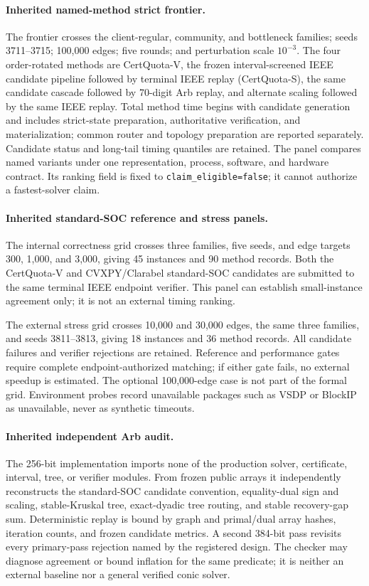 \paragraph{Inherited named-method strict frontier.}
The frontier crosses the client-regular, community, and bottleneck families;
seeds 3711--3715; 100,000 edges; five rounds; and perturbation scale $10^{-3}$.
The four order-rotated methods are CertQuota-V, the frozen interval-screened
IEEE candidate pipeline followed by terminal IEEE replay (CertQuota-S), the
same candidate cascade followed by 70-digit Arb replay, and alternate scaling
followed by the same IEEE replay.  Total method time begins with candidate
generation and includes strict-state preparation, authoritative verification,
and materialization; common router and topology preparation are reported
separately.  Candidate status and long-tail timing quantiles are retained.  The
panel compares named variants under one representation, process, software, and
hardware contract.  Its ranking field is fixed to
\texttt{claim\_eligible=false}; it cannot authorize a fastest-solver claim.

\paragraph{Inherited standard-SOC reference and stress panels.}
The internal correctness grid crosses three families, five seeds, and edge
targets 300, 1,000, and 3,000, giving 45 instances and 90 method records.  Both
the CertQuota-V and CVXPY/Clarabel standard-SOC candidates are submitted to the
same terminal IEEE endpoint verifier.  This panel can establish small-instance
agreement only; it is not an external timing ranking.

The external stress grid crosses 10,000 and 30,000 edges, the same three
families, and seeds 3811--3813, giving 18 instances and 36 method records.  All
candidate failures and verifier rejections are retained.  Reference and
performance gates require complete endpoint-authorized matching; if either gate
fails, no external speedup is estimated.  The optional 100,000-edge case is not
part of the formal grid.  Environment probes record unavailable packages such
as VSDP or BlockIP as unavailable, never as synthetic timeouts.

\paragraph{Inherited independent Arb audit.}
The 256-bit implementation imports none of the production solver, certificate,
interval, tree, or verifier modules.  From frozen public arrays it independently
reconstructs the standard-SOC candidate convention, equality-dual sign and
scaling, stable-Kruskal tree, exact-dyadic tree routing, and stable recovery-gap
sum.  Deterministic replay is bound by graph and primal/dual array hashes,
iteration counts, and frozen candidate metrics.  A second 384-bit pass revisits
every primary-pass rejection named by the registered design.  The checker may
diagnose agreement or bound inflation for the same predicate; it is neither an
external baseline nor a general verified conic solver.

